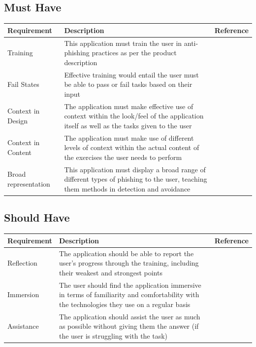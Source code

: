 \documentclass{l4proj}
\begin{document}
\subsection{Must Have}
\begin{tabular}{ | m{10em} | m{25em}| m{5em} | } 
  \hline
  \textbf{Requirement} & \textbf{Description} & \textbf{Reference} \\ 
  \hline
  Training & This application must train the user in anti-phishing practices as per the product description &  \\ 
  \hline
  Fail States & Effective training would entail the user must be able to pass or fail tasks based on their input &  \\ 
  \hline
  Context in Design & The application must make effective use of context within the look/feel of the application itself as well as the tasks given to the user &  \\  
  \hline
  Context in Content & The application must make use of different levels of context within the actual content of the exercises the user needs to perform &  \\  
  \hline
  Broad representation & This application must display a broad range of different types of phishing to the user, teaching them methods in detection and avoidance &  \\  
  \hline
\end{tabular}

\subsection{Should Have}
\begin{tabular}{ | m{10em} | m{25em}| m{5em} | } 
  \hline
  \textbf{Requirement} & \textbf{Description} & \textbf{Reference} \\ 
  \hline
  Reflection & The application should be able to report the user’s progress through the training, including their weakest and strongest points &  \\ 
  \hline
  Immersion & The user should find the application immersive in terms of familiarity and comfortability with the technologies they use on a regular basis &  \\ 
  \hline
  Assistance & The application should assist the user as much as possible without giving them the answer (if the user is struggling with the task) &  \\ 
  \hline
\end{tabular}
\end{document}
